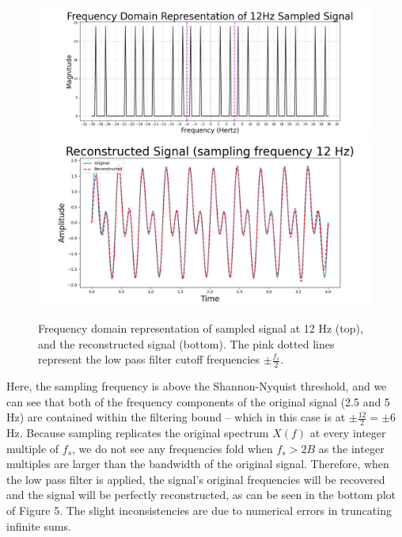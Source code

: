 \documentclass{article}
\begin{document}
\begin{figure}[H]
    \centering
    \begin{minipage}{\textwidth}
        \centering
        \includegraphics[width=\linewidth]{images/pink_freqdom_12hz.png}
        \includegraphics[width=\linewidth]{images/ogcolors_reconstructed_12hz.png}
        \\[0.5em] 
    \end{minipage}
    \caption{Frequency domain representation of sampled signal at 12 Hz (top), and the reconstructed signal (bottom). 
    The pink dotted lines represent the low pass filter cutoff frequencies $\pm \frac{f_s}{2}$.}
\end{figure}
Here, the sampling frequency is above the Shannon-Nyquist threshold, and we can see that both of the frequency components of the original signal (2.5 and 5 Hz) are contained within the filtering bound -- which in this case is at $ \pm \frac{12}{2}= \pm 6$ Hz. 
Because sampling replicates the original spectrum $X(f)$ at every integer multiple of $f_s$, we do not see any frequencies fold when $f_s > 2B$ as the integer multiples are larger than the bandwidth of the original signal.
Therefore, when the low pass filter is applied, the signal's original frequencies will be recovered and the signal will be perfectly reconstructed, as can be seen in the bottom plot of Figure 5.
The slight inconsistencies are due to numerical errors in truncating infinite sums.
\end{document}
